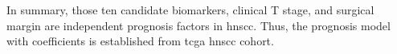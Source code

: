 \documentclass[12pt, a4paper]{article}
\begin{document}
In summary, those ten candidate biomarkers, clinical T stage, and surgical margin are independent prognosis factors in \acrshort{hnscc}.
Thus, the prognosis model with coefficients is established from \acrshort{tcga} \acrshort{hnscc} cohort. 
\end{document}
